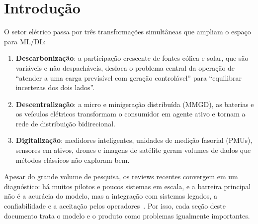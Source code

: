 \documentclass[10pt,a4paper,oneside]{article}
\begin{document}
\rosto

\begin{abstract}
Este documento aprofunda quatro frentes de aplicação de aprendizado de máquina
(ML) e aprendizado profundo (DL) no setor elétrico: (1)~previsão de carga,
geração renovável e preço; (2)~operação e otimização da rede;
(3)~detecção de falhas, proteção e manutenção preditiva; e (4)~distribuição e
consumidor final. Para cada frente são apresentados o problema de negócio, a
formulação matemática, as famílias de modelos, os dados necessários, as
métricas de avaliação e os desafios práticos. Cada seção termina com
uma visão de produto: quem é o usuário, que problema se resolve, qual o
escopo mínimo viável, a arquitetura de referência, as métricas de sucesso, o
modelo de negócio e os riscos. O contexto regulatório e operacional brasileiro
(ONS, CCEE, ANEEL, distribuidoras) é usado como pano de fundo sempre que
relevante.
\end{abstract}

\tableofcontents
\newpage

\section{Introdução}

O setor elétrico passa por três transformações simultâneas que ampliam o
espaço para ML/DL:

\begin{enumerate}
  \item \textbf{Descarbonização}: a participação crescente de fontes eólica e
    solar, que são variáveis e não despacháveis, desloca o problema central
    da operação de ``atender a uma carga previsível com geração controlável''
    para ``equilibrar incertezas dos dois lados''.
  \item \textbf{Descentralização}: a micro e minigeração distribuída (MMGD),
    as baterias e os veículos elétricos transformam o consumidor em agente
    ativo e tornam a rede de distribuição bidirecional.
  \item \textbf{Digitalização}: medidores inteligentes, unidades de medição
    fasorial (PMUs), sensores em ativos, drones e imagens de satélite geram
    volumes de dados que métodos clássicos não exploram bem.
\end{enumerate}

Apesar do grande volume de pesquisa, os reviews recentes convergem em um
diagnóstico: há muitos pilotos e poucos sistemas em escala, e a barreira
principal não é a acurácia do modelo, mas a integração com sistemas legados, a
confiabilidade e a aceitação pelos operadores~\cite{energyinformatics2025,trustworthy2024}.
Por isso, cada seção deste documento trata o modelo e o produto
como problemas igualmente importantes.
\end{document}
